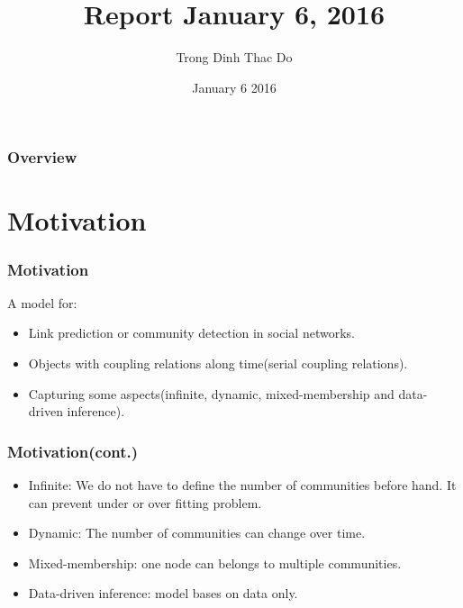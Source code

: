 \documentclass{beamer}
\title[Short title]{Report January 6, 2016} %
\author{Trong Dinh Thac Do} %
\institute[AAI] %
{
University of Technology Sydney \\ %
\medskip
\textit{trongdinhthac.do@student.uts.edu.au} %
}
\date{January 6 2016} %
\begin{document}
\begin{frame}
\titlepage %
\end{frame}

\begin{frame}
\frametitle{Overview} %
\tableofcontents %
\end{frame}


\section{Motivation} %

\begin{frame}
\frametitle{Motivation}
A model for:
\begin{itemize}
\item Link prediction or community detection in social networks.
\item Objects with coupling relations along time(serial coupling relations).
\item Capturing some aspects(infinite, dynamic, mixed-membership and data-driven inference).
\end{itemize}
\end{frame}


\begin{frame}
\frametitle{Motivation(cont.)}
\begin{itemize}
\item Infinite: We do not have to define the number of communities before hand. It can prevent under or over fitting problem.
\item Dynamic: The number of communities can change over time.
\item Mixed-membership: one node can belongs to multiple communities.
\item Data-driven inference: model bases on data only.
\end{itemize}
\end{frame}
\end{document}
